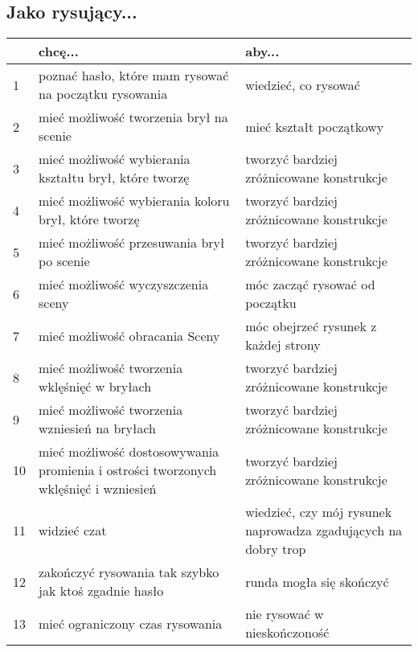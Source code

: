\subsection{Jako rysujący...}
\begin{center}
    \begin{tabular}{ | l || p{6cm} | p{6cm} |}
    \hline
     & \textbf{chcę...} & \textbf{aby...} \\ \hline \hline
    1 & poznać hasło, które mam rysować na początku rysowania & wiedzieć, co rysować \\ \hline
    2 & mieć możliwość tworzenia brył na scenie & mieć kształt początkowy \\ \hline
    3 & mieć możliwość wybierania kształtu brył, które tworzę & tworzyć bardziej zróżnicowane konstrukcje \\ \hline
    4 & mieć możliwość wybierania koloru brył, które tworzę & tworzyć bardziej zróżnicowane konstrukcje \\ \hline
    5 & mieć możliwość przesuwania brył po scenie & tworzyć bardziej zróżnicowane konstrukcje \\ \hline
    6 & mieć możliwość wyczyszczenia sceny & móc zacząć rysować od początku \\ \hline
    7 & mieć możliwość obracania Sceny & móc obejrzeć rysunek z każdej strony \\ \hline
    8 & mieć możliwość tworzenia wklęśnięć w bryłach & tworzyć bardziej zróżnicowane konstrukcje \\ \hline
    9 & mieć możliwość tworzenia wzniesień na bryłach & tworzyć bardziej zróżnicowane konstrukcje \\ \hline
    10 & mieć możliwość dostosowywania promienia i ostrości tworzonych wklęśnięć i wzniesień & tworzyć bardziej zróżnicowane konstrukcje \\ \hline
    11 & widzieć czat & wiedzieć, czy mój rysunek naprowadza zgadujących na dobry trop \\ \hline
    12 & zakończyć rysowania tak szybko jak ktoś zgadnie hasło & runda mogła się skończyć \\ \hline
    13 & mieć ograniczony czas rysowania & nie rysować w nieskończoność \\ \hline
    \end{tabular}
\end{center}

